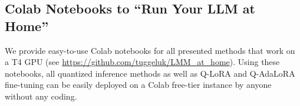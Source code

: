 \documentclass[conference]{IEEEtran}
\begin{document}



\subsection{Colab Notebooks to ``Run Your LLM at Home''}
\label{sec:notebooks}
We provide easy-to-use Colab notebooks for all presented methods that work on a T4 GPU (see \url{https://github.com/tuggeluk/LMM_at_home}). Using these notebooks, all quantized inference methods as well as Q-LoRA and Q-AdaLoRA fine-tuning can be easily deployed on a Colab free-tier instance by anyone without any coding.
\end{document}
